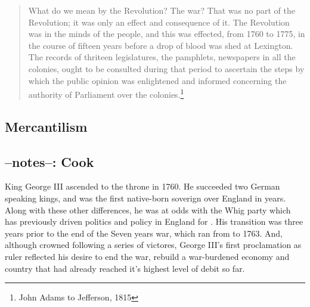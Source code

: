 \begin{quotation}
  What do we mean by the Revolution? The war? That was no part of the Revolution;
  it was only an effect and consequence of it. The Revolution was in the minds of
  the people, and this was effected, from 1760 to 1775, in the course of
  fifteen years before a drop of blood was shed at Lexington. The records of
  thriteen legislatures, the pamphlets, newspapers in all the colonies, ought
  to be consulted during that period to ascertain the steps by which the public
  opinion was enlightened and informed concerning the authority of Parliament
  over the colonies.\footnote{John Adams to Jefferson, 1815}
\end{quotation}

\subsection{Mercantilism}

\subsection{--notes--: Cook}

King George III ascended to the throne in 1760. He succeeded two German
speaking kings, and was the first native-born soverign over England in
 years. Along with these other differences, he was at odds with the
Whig party which has previously driven politics and policy in England for
. His transition was three years prior to the end of the Seven
years war, which ran from  to 1763. And, although crowned following a
series of victores, George III's first proclamation as ruler reflected his
desire to end the war, rebuild a war-burdened economy and country that had
already reached it's highest level of debit so far.


